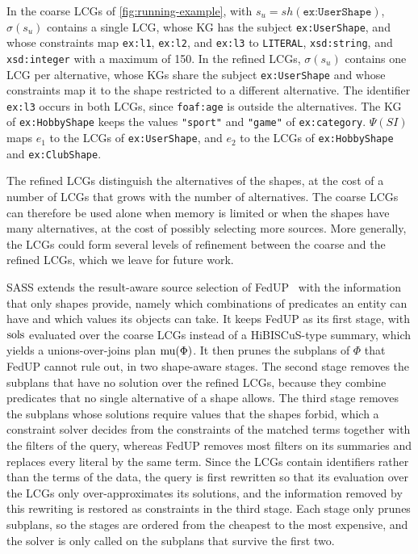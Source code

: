 In the coarse \acsp{LCG} of \cref{fig:running-example}, with $s_u = \mathit{sh}(\texttt{ex:UserShape})$, $\sigma(s_u)$ contains a single \ac{LCG},
whose \ac{KG} has the subject \texttt{ex:UserShape},
and whose constraints map \texttt{ex:l1}, \texttt{ex:l2}, and \texttt{ex:l3} to \texttt{LITERAL}, \texttt{xsd:string}, and \texttt{xsd:integer} with a maximum of 150.
In the refined \acsp{LCG}, $\sigma(s_u)$ contains one \ac{LCG} per alternative,
whose \acp{KG} share the subject \texttt{ex:UserShape} and whose constraints map it to the shape restricted to a different alternative.
The identifier \texttt{ex:l3} occurs in both \acp{LCG}, since \texttt{foaf:age} is outside the alternatives.
The \ac{KG} of \texttt{ex:HobbyShape} keeps the values \texttt{"sport"} and \texttt{"game"} of \texttt{ex:category}.
$\Psi(SI)$ maps $e_1$ to the \acp{LCG} of \texttt{ex:UserShape}, and $e_2$ to the \acp{LCG} of \texttt{ex:HobbyShape} and \texttt{ex:ClubShape}.

The refined \acsp{LCG} distinguish the alternatives of the shapes,
at the cost of a number of \acsp{LCG} that grows with the number of alternatives.
The coarse \acsp{LCG} can therefore be used alone when memory is limited or when the shapes have many alternatives,
at the cost of possibly selecting more sources.
More generally, the \acsp{LCG} could form several levels of refinement between the coarse and the refined \acsp{LCG}, which we leave for future work.

\ac{SASS} extends the result-aware source selection of FedUP~\cite{aimonierdavat:hal-04538238} with the information that only shapes provide,
namely which combinations of predicates an entity can have and which values its objects can take.
It keeps FedUP as its first stage, with $\operatorname{sols}$ evaluated over the coarse \acsp{LCG} instead of a HiBISCuS-type summary, which yields a unions-over-joins plan $\operatorname{mu}(\Phi)$.
It then prunes the subplans of $\Phi$ that FedUP cannot rule out, in two shape-aware stages.
The second stage removes the subplans that have no solution over the refined \acsp{LCG}, because they combine predicates that no single alternative of a shape allows.
The third stage removes the subplans whose solutions require values that the shapes forbid,
which a constraint solver decides from the constraints of the matched terms together with the filters of the query,
whereas FedUP removes most filters on its summaries and replaces every literal by the same term.
Since the \acp{LCG} contain identifiers rather than the terms of the data, the query is first rewritten so that its evaluation over the \acp{LCG} only over-approximates its solutions,
and the information removed by this rewriting is restored as constraints in the third stage.
Each stage only prunes subplans, so the stages are ordered from the cheapest to the most expensive,
and the solver is only called on the subplans that survive the first two.

